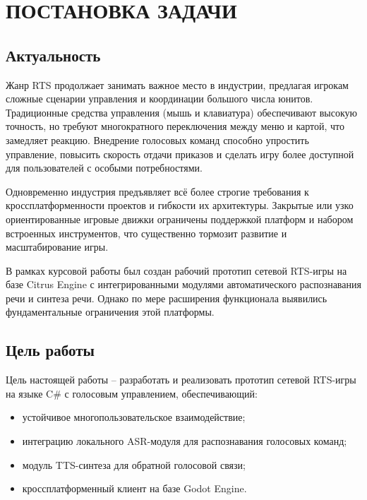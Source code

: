 \section{ПОСТАНОВКА ЗАДАЧИ}

    \subsection{Актуальность} 
    Жанр RTS продолжает занимать важное место в индустрии, предлагая игрокам сложные сценарии управления и координации большого числа юнитов. 
    Традиционные средства управления (мышь и клавиатура) обеспечивают высокую точность, но требуют многократного переключения между меню и картой, 
    что замедляет реакцию. Внедрение голосовых команд способно упростить управление, повысить скорость отдачи приказов и сделать игру более 
    доступной для пользователей с особыми потребностями.

    Одновременно индустрия предъявляет всё более строгие требования к кроссплатформенности проектов и гибкости их архитектуры. Закрытые или узко 
    ориентированные игровые движки ограничены поддержкой платформ и набором встроенных инструментов, что существенно тормозит 
    развитие и масштабирование игры.

    В рамках курсовой работы был создан рабочий прототип сетевой RTS-игры на базе Citrus Engine с интегрированными модулями автоматического 
    распознавания речи и синтеза речи. Однако по мере расширения функционала выявились фундаментальные ограничения этой платформы.

    \subsection{Цель работы}
    Цель настоящей работы -- разработать и реализовать прототип сетевой RTS-игры на языке C\# с голосовым управлением, обеспечивающий:
    \begin{itemize}
        \item устойчивое многопользовательское взаимодействие;
        \item интеграцию локального ASR-модуля для распознавания голосовых команд;
        \item модуль TTS-синтеза для обратной голосовой связи;
        \item кроссплатформенный клиент на базе Godot Engine.
    \end{itemize}


